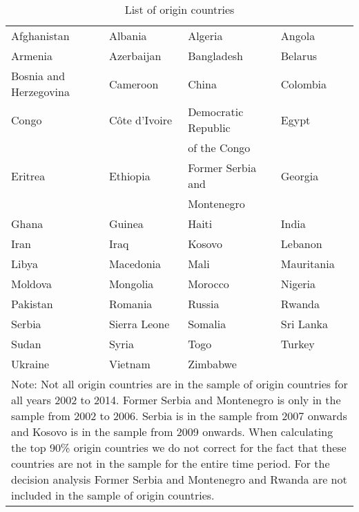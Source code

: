 \begin{table}[!ht]\centering \footnotesize
	\caption{List of origin countries}
	\begin{tabularx}{\textwidth}{XXXX}
		\hline \hline
		Afghanistan & Albania & 	Algeria & 	Angola \\
		[0.4em]
		Armenia & 	Azerbaijan & 	Bangladesh & Belarus \\
		[0.4em]
		Bosnia and Herzegovina & 	Cameroon & 	China & Colombia \\
		[0.4em]
		Congo & 	Côte d'Ivoire & Democratic Republic  & 	Egypt \\
		& 	 & of the Congo &  \\
		[0.4em]
		Eritrea & 	Ethiopia & 	Former Serbia and & 	Georgia  \\
		 &  & 	 Montenegro &  \\
		[0.4em]
		Ghana & Guinea & 	Haiti & India \\
		[0.4em]
		Iran &  Iraq &  Kosovo & Lebanon \\
		[0.4em]
		Libya & Macedonia & Mali & 	Mauritania \\
		[0.4em]
		Moldova & 	Mongolia & 	Morocco & 	Nigeria \\
		[0.4em]
		Pakistan & 	Romania & 	Russia & 	Rwanda \\
		[0.4em]
		Serbia & Sierra Leone & Somalia & Sri Lanka \\
		[0.4em]
		Sudan & Syria & Togo & Turkey \\
		[0.4em]
		Ukraine & 	Vietnam & 	Zimbabwe & \\
		\hline \hline
		\multicolumn{4}{p{\linewidth}}{Note: Not all origin countries are in the sample of origin countries for all years 2002 to 2014. Former Serbia and Montenegro is only in the sample from 2002 to 2006. Serbia is in the sample from 2007 onwards and Kosovo is in the sample from 2009 onwards. When calculating the top 90\% origin countries we do not correct for the fact that these countries are not in the sample for the entire time period. For the decision analysis Former Serbia and Montenegro and Rwanda are not included in the sample of origin countries.}
	\end{tabularx}
\label{all_origin}
\end{table}
